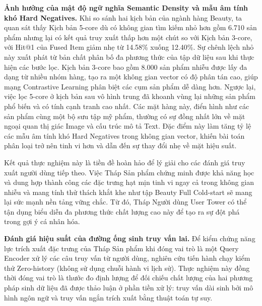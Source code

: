 \textbf{Ảnh hưởng của mật độ ngữ nghĩa Semantic Density và mẫu âm tính khó Hard Negatives.} Khi so sánh hai kịch bản của ngành hàng Beauty, ta quan sát thấy Kịch bản 5-core dù có không gian tìm kiếm nhỏ hơn gồm 6.710 sản phẩm nhưng lại có kết quả truy xuất thấp hơn một chút so với Kịch bản 3-core, với Hit@1 của Fused Item giảm nhẹ từ 14.58\% xuống 12.40\%. Sự chênh lệch nhỏ này xuất phát từ bản chất phân bố đa phương thức của tập dữ liệu sau khi thực hiện các bước lọc. 
Kịch bản 3-core bao gồm 8.000 sản phẩm nhiễu được lấy đa dạng từ nhiều nhóm hàng, tạo ra một không gian vector có độ phân tán cao, giúp mạng Contrastive Learning phân biệt các cụm sản phẩm dễ dàng hơn. Ngược lại, việc lọc 5-core ở kịch bản sau vô hình trung đã khoanh vùng lại những sản phẩm phổ biến và có tính cạnh tranh cao nhất. Các mặt hàng này, điển hình như các sản phẩm cùng một bộ sưu tập mỹ phẩm, thường có sự đồng nhất lớn về mặt ngoại quan thị giác Image và cấu trúc mô tả Text. Đặc điểm này làm tăng tỷ lệ các mẫu âm tính khó Hard Negatives trong không gian vector, khiến bài toán phân loại trở nên tinh vi hơn và dẫn đến sự thay đổi nhẹ về mặt hiệu suất.

Kết quả thực nghiệm này là tiền đề hoàn hảo để lý giải cho các đánh giá truy xuất người dùng tiếp theo. Việc Tháp Sản phẩm chứng minh được khả năng học và dung hợp thành công các đặc trưng hạt mịn tinh vi ngay cả trong không gian nhiễu và mang tính thử thách khắt khe như tập Beauty Full Cold-start sẽ mang lại sức mạnh nền tảng vững chắc. Từ đó, Tháp Người dùng User Tower có thể tận dụng biểu diễn đa phương thức chất lượng cao này để tạo ra sự đột phá trong gợi ý cá nhân hóa.

\textbf{Đánh giá hiệu suất của đường ống sinh truy vấn lai.} 
Để kiểm chứng năng lực trích xuất đặc trưng của Tháp Sản phẩm khi đóng vai trò là một Query Encoder xử lý các câu truy vấn từ người dùng, nghiên cứu tiến hành chạy kiểm thử Zero-history (không sử dụng chuỗi hành vi lịch sử). Thực nghiệm này đồng thời đóng vai trò là thước đo định lượng để đối chiếu chất lượng của hai phương pháp sinh dữ liệu đã được thảo luận ở phần tiền xử lý: truy vấn dài sinh bởi mô hình ngôn ngữ và truy vấn ngắn trích xuất bằng thuật toán tự suy.

